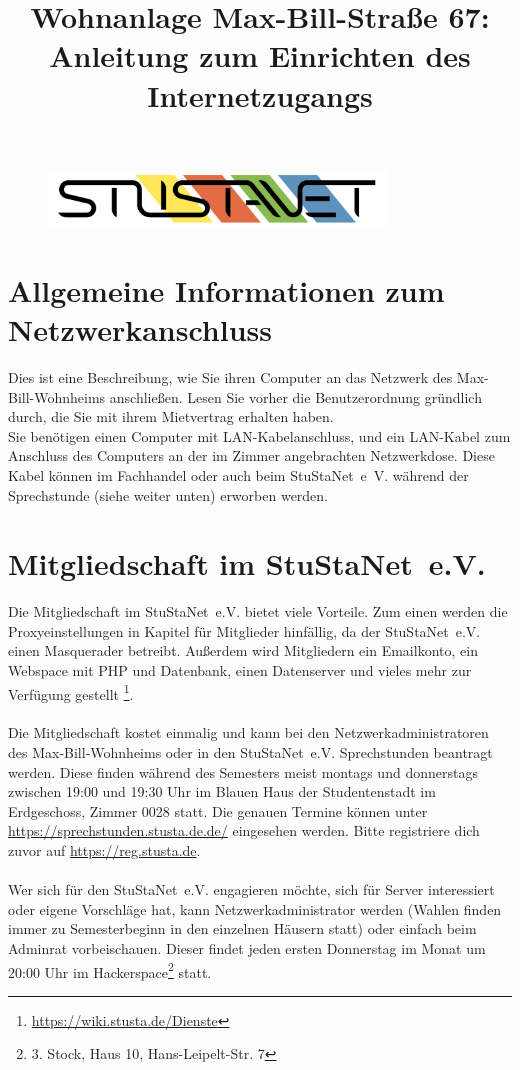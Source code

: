 \documentclass[a4paper,12pt]{scrartcl}
\title{Wohnanlage Max-Bill-Straße 67:\\
       Anleitung zum Einrichten des Internetzugangs}
\begin{document}
\maketitle

\begin{figure}[t!]
   \centering
   \vspace{-20pt}
   \includegraphics[width=0.8\textwidth,keepaspectratio]{Bilder/StuStaNet_Logo}
   \vspace{-40pt}
\end{figure}

\section*{Allgemeine Informationen zum Netzwerkanschluss}

Dies ist eine Beschreibung, wie Sie ihren Computer an das Netzwerk des Max-Bill-Wohnheims anschließen. Lesen Sie vorher die Benutzerordnung gründlich durch, die Sie mit ihrem Mietvertrag erhalten haben.
\\Sie benötigen einen Computer mit LAN-Kabelanschluss, und ein LAN-Kabel zum Anschluss des Computers an der im Zimmer angebrachten Netzwerkdose. Diese Kabel können im Fachhandel oder auch beim StuStaNet~e~V. während der Sprechstunde (siehe weiter unten) erworben werden.

\section*{Mitgliedschaft im StuStaNet~e.V.}

Die Mitgliedschaft im StuStaNet~e.V. bietet viele Vorteile. Zum einen werden die Proxyeinstellungen in Kapitel \emph{} für Mitglieder hinfällig, da der StuStaNet~e.V. einen Masquerader betreibt. Außerdem wird Mitgliedern ein Emailkonto, ein Webspace mit PHP und Datenbank, einen Datenserver und vieles mehr  zur Verfügung gestellt \footnote{\url{https://wiki.stusta.de/Dienste}}.
\\
\\Die Mitgliedschaft kostet einmalig  und kann bei den Netzwerkadministratoren des Max-Bill-Wohnheims oder in den StuStaNet~e.V. Sprechstunden beantragt werden. Diese finden während des Semesters meist montags und donnerstags zwischen 19:00 und 19:30 Uhr im Blauen Haus der Studentenstadt im Erdgeschoss, Zimmer 0028 statt. Die genauen Termine können unter \url{https://sprechstunden.stusta.de.de/} eingesehen werden. Bitte registriere dich zuvor auf \url{https://reg.stusta.de}.
\\
\\Wer sich für den StuStaNet~e.V. engagieren möchte, sich für Server interessiert oder eigene Vorschläge hat, kann Netzwerkadministrator werden (Wahlen finden immer zu Semesterbeginn in den einzelnen Häusern statt) oder einfach beim Adminrat vorbeischauen. Dieser findet jeden ersten Donnerstag im Monat um 20:00 Uhr im Hackerspace\footnote{3. Stock, Haus 10, Hans-Leipelt-Str. 7} statt.
\end{document}
